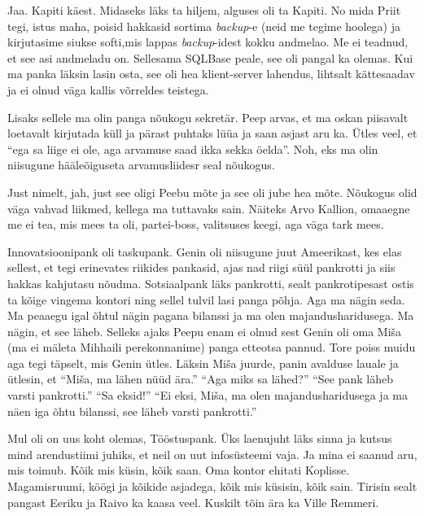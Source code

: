 
Jaa. Kapiti käest. Midaseks läks ta hiljem, alguses oli ta Kapiti. No mida 
Priit tegi, istus maha,  poisid hakkasid sortima \emph{backup}-e (neid me 
tegime hoolega) ja kirjutasime siukse softi,mis lappas \emph{backup}-idest 
kokku andmelao. Me ei teadnud, et see asi andmeladu on. Sellesama SQLBase 
peale, see oli pangal ka olemas. Kui ma panka läksin lasin osta, see oli hea 
klient-server lahendus, lihtsalt kättesaadav ja ei olnud väga kallis võrreldes 
teistega. 

Lisaks sellele ma olin panga nõukogu sekretär. Peep arvas, et ma oskan 
piisavalt loetavalt kirjutada küll ja pärast puhtaks lüüa ja saan asjast aru 
ka. Ütles veel, et \enquote{ega sa liige ei ole, aga arvamuse saad ikka sekka 
öelda}. Noh, eks ma olin niisugune hääleõiguseta arvamusliidesr seal nõukogus.


Just nimelt, jah, just see oligi Peebu mõte ja see oli jube hea mõte. Nõukogus 
olid väga vahvad liikmed, kellega ma tuttavaks sain. Näiteks Arvo 
Kallion, omaaegne me ei tea, mis mees ta oli, 
partei-boss, valitsuses keegi, aga väga tark mees. 

Innovatsioonipank oli taskupank. Genin oli niisugune juut Ameerikast, kes 
elas sellest, et tegi erinevates riikides pankasid, ajas nad riigi süül 
pankrotti ja siis hakkas kahjutasu nõudma. 
Sotsiaalpank läks pankrotti, sealt pankrotipesast 
ostis ta kõige vingema kontori ning sellel tulvil lasi panga põhja. Aga ma 
nägin seda. Ma peaaegu igal õhtul nägin pagana bilanssi ja ma olen 
majandusharidusega. Ma nägin, et see läheb. Selleks ajaks Peepu enam ei olnud 
sest Genin oli oma Miša (ma ei mäleta Mihhaili perekonnanime) panga etteotsa 
pannud. Tore poiss muidu aga tegi täpselt, mis Genin ütles. Läksin Miša juurde, 
panin avalduse lauale ja ütlesin, et \enquote{Miša, ma lähen nüüd ära.}  
\enquote{Aga miks sa lähed?} \enquote{See pank läheb varsti pankrotti.} 
\enquote{Sa eksid!} \enquote{Ei eksi, Miša, ma olen majandusharidusega ja ma 
näen iga õhtu bilanssi, see läheb varsti pankrotti.} 

Mul oli on uus koht olemas, Tööstuspank. Üks 
laenujuht läks sinna ja kutsus mind arendustiimi juhiks, et neil on uut 
infosüsteemi vaja. Ja mina ei saanud aru, mis toimub. Kõik mis küsin, kõik 
saan. Oma kontor ehitati Koplisse. Magamisruumi, köögi ja kõikide asjadega, 
kõik mis küsisin, kõik sain. Tirisin sealt pangast Eeriku ja  Raivo ka kaasa veel. Kuskilt tõin ära ka Ville Remmeri.

